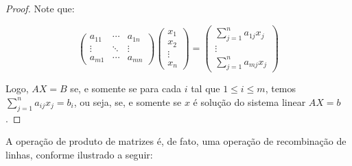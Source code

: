 \begin{proof}
    Note que:

    \begin{equation*}
        \begin{pmatrix}
            a_{11}& \cdots & a_{1n} \\
            \vdots & \ddots & \vdots \\
            a_{m1} & \cdots & a_{mn}
        \end{pmatrix}
        \begin{pmatrix}
            x_1 \\
            x_2 \\
            \vdots \\
            x_n
        \end{pmatrix}
        =
        \begin{pmatrix}
            \sum_{j=1}^n a_{1j} x_j \\
            \vdots \\
            \sum_{j=1}^n a_{mj} x_j
        \end{pmatrix}
    \end{equation*}

    Logo, $AX=B$ se, e somente se para cada $i$ tal que $1\leq i \leq m$, temos $\sum_{j=1}^n a_{ij} x_j = b_i$, ou seja, se, e somente se $x$ é solução do sistema linear $AX=b$.
\end{proof}

A operação de produto de matrizes é, de fato, uma operação de recombinação de linhas, conforme ilustrado a seguir:

